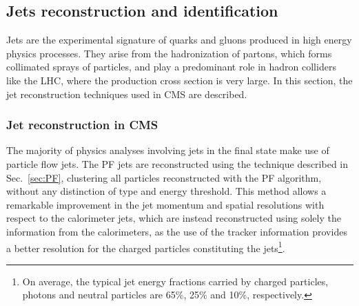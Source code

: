 
	
\subsection{Jets reconstruction and identification}\label{chap2:jets}

Jets are the experimental signature of quarks and gluons produced in high energy physics processes. They arise from the hadronization of partons, which forms collimated sprays of particles, and play a predominant role in hadron colliders like the LHC, where the production cross section is very large. In this section, the jet reconstruction techniques used in CMS are described.

\subsubsection{Jet reconstruction in CMS}

The majority of physics analyses involving jets in the final state make use of particle flow jets. The PF jets are reconstructed using the technique described in Sec.~\ref{sec:PF}, clustering all particles reconstructed with the PF algorithm, without any distinction of type and energy threshold. This method allows a remarkable improvement in the jet momentum and spatial resolutions with respect to the calorimeter jets, which are instead reconstructed using solely the information from the calorimeters, as the use of the tracker information provides a better \pt resolution for the charged particles constituting the jets\footnote{On average, the typical jet energy fractions carried by charged particles, photons and neutral particles are 65\%, 25\% and 10\%, respectively.}. 

